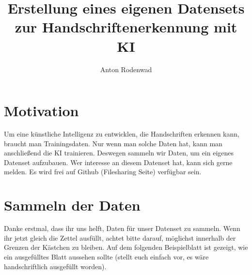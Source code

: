 \documentclass[a4paper]{article}
\begin{document}
\author{Anton Rodenwad}
\title{Erstellung eines eigenen Datensets zur Handschriftenerkennung mit KI}
\date{}

\maketitle

\thispagestyle{empty}


\section{Motivation}
Um eine künstliche Intelligenz zu entwicklen, die Handschriften erkennen kann,
braucht man Trainingsdaten. Nur wenn man solche Daten hat, kann man
anschließend die KI trainieren. Deswegen sammeln wir Daten,
um ein eigenes Datenset aufzubauen.
Wer interesse an diesem Datenset hat, kann sich gerne melden.
Es wird frei auf Github (Filesharing Seite) verfügbar sein.

\section{Sammeln der Daten}
Danke erstmal, dass ihr uns helft, Daten für unser Datenset zu sammeln.
Wenn ihr jetzt gleich die Zettel ausfüllt, achtet bitte darauf, möglichst
innerhalb der Grenzen der Kästchen zu bleiben.
Auf dem folgenden Beispielblatt ist gezeigt, wie ein ausgefülltes Blatt
aussehen sollte (stellt euch einfach vor, es wäre handschriftlich ausgefüllt
worden).
\end{document}
